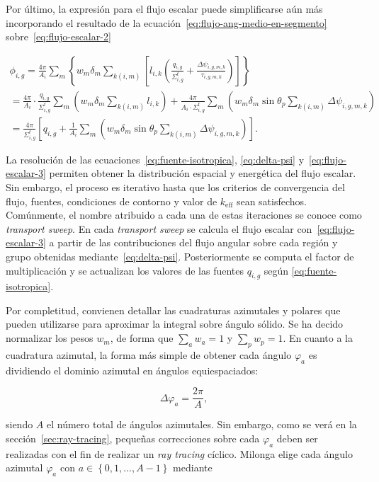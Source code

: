 \documentclass[11pt]{article}
\numberwithin{equation}{section}
\begin{document}
Por último, la expresi\'on para el flujo escalar puede simplificarse aún m\'as incorporando el resultado de la ecuación~\eqref{eq:flujo-ang-medio-en-segmento} sobre~\eqref{eq:flujo-escalar-2}

\begin{multline} \label{eq:flujo-escalar-3}
 \phi_{i,g} =
 \frac{4\pi}{A_i} \sum_m \left\lbrace w_m \delta_m \sum_{k(i,m)} \left[ l_{i,k} \left( \frac{q_{i,g}}{\Sigma^t_{i,g}} + \frac{\Delta \psi_{i,g,m,k}}{\tau_{i,g,m,k}} \right) \right] \right\rbrace \\ 
 = \frac{4\pi}{A_i} \cdot \frac{q_{i,g}}{\Sigma^t_{i,g}} \sum_m \left( w_m \delta_m \sum_{k(i,m)} l_{i,k} \right) + \frac{4\pi}{A_i \cdot \Sigma^t_{i,g}} \sum_m \left( w_m \delta_m \sin \theta_p \sum_{k(i,m)} \Delta \psi_{i,g,m,k} \right) \\ 
 = \frac{4\pi}{\Sigma^t_{i,g}} \left[ q_{i,g} + \frac{1}{A_i} \sum_m \left( w_m \delta_m \sin \theta_p \sum_{k(i,m)} \Delta \psi_{i,g,m,k} \right) \right]
 .
\end{multline}

La resolución de las ecuaciones~\eqref{eq:fuente-isotropica}, \eqref{eq:delta-psi} y~\eqref{eq:flujo-escalar-3} permiten obtener la distribución espacial y energética del flujo escalar. Sin embargo, el proceso es iterativo hasta que los criterios de convergencia del flujo, fuentes, condiciones de contorno y valor de $k_{\text{eff}}$ sean satisfechos. Comúnmente, el nombre atribuido a cada una de estas iteraciones se conoce como \emph{transport sweep}. En cada \emph{transport sweep} se calcula el flujo escalar con~\eqref{eq:flujo-escalar-3} a partir de las contribuciones del flujo angular sobre cada región y grupo obtenidas mediante~\eqref{eq:delta-psi}. Posteriormente se computa el factor de multiplicación y se actualizan los valores de las fuentes $q_{i,g}$ seg\'un \eqref{eq:fuente-isotropica}.

Por completitud, convienen detallar las cuadraturas azimutales y polares que pueden utilizarse para aproximar la integral sobre \'angulo s\'olido. Se ha decido normalizar los pesos $w_m$, de forma que $\sum_a w_a = 1$ y $\sum_p w_p = 1$. En cuanto a la cuadratura azimutal, la forma más simple de obtener cada ángulo $\varphi_a$ es dividiendo el dominio azimutal en ángulos equiespaciados:

\begin{equation}
 \Delta \varphi_a = \frac{2\pi}{A},
\end{equation}

\noindent
siendo $A$ el número total de ángulos azimutales. Sin embargo, como se verá en la sección~\ref{sec:ray-tracing}, pequeñas correcciones sobre cada $\varphi_a$ deben ser realizadas con el fin de realizar un \emph{ray tracing} cíclico. Milonga elige cada ángulo azimutal $\varphi_a$ con $a \in \left\lbrace 0, 1, ..., A-1 \right\rbrace$ mediante
\end{document}

